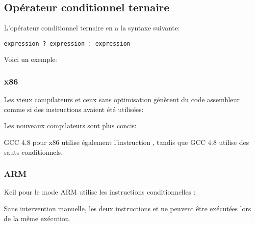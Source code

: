\subsection{Opérateur conditionnel ternaire}
\label{chap:cond}

L'opérateur conditionnel ternaire en \CCpp a la syntaxe suivante:

\begin{lstlisting}
expression ? expression : expression
\end{lstlisting}

Voici un exemple:



\subsubsection{x86}

Les vieux compilateurs et ceux sans optimisation génèrent du code assembleur comme
si des instructions  avaient été utilisées:





Les nouveaux compilateurs sont plus concis:



GCC 4.8 \Optimizing pour x86 utilise également l'instruction , tandis
que GCC 4.8 \NonOptimizing utilise des sauts conditionnels.

\subsubsection{ARM}

Keil \Optimizing pour le mode ARM utilise les instructions conditionnelles :



Sans intervention manuelle, les deux instructions  et  ne peuvent
être exécutées lors de la même exécution.


